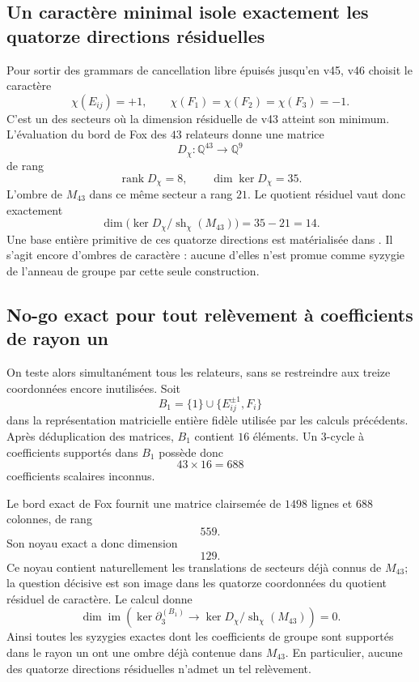 \documentclass[11pt,a4paper]{article}
\begin{document}
\subsection{Un caractère minimal isole exactement les quatorze directions résiduelles}

Pour sortir des grammars de cancellation libre épuisés jusqu'en v45, v46 choisit le caractère
\[
 \chi(E_{ij})=+1,
 \qquad
 \chi(F_1)=\chi(F_2)=\chi(F_3)=-1.
\]
C'est un des secteurs où la dimension résiduelle de v43 atteint son minimum. L'évaluation du bord de Fox des $43$ relateurs donne une matrice
\[
 D_\chi:\mathbb Q^{43}\longrightarrow\mathbb Q^9
\]
de rang
\[
 \boxed{\operatorname{rank}D_\chi=8},
 \qquad
 \boxed{\dim\ker D_\chi=35}.
\]
L'ombre de $M_{43}$ dans ce même secteur a rang $21$. Le quotient résiduel vaut donc exactement
\[
 \boxed{
 \dim\bigl(\ker D_\chi/\operatorname{sh}_\chi(M_{43})\bigr)
 =35-21=14.}
\]
Une base entière primitive de ces quatorze directions est matérialisée dans . Il s'agit encore d'ombres de caractère : aucune d'elles n'est promue comme syzygie de l'anneau de groupe par cette seule construction.

\subsection{No-go exact pour tout relèvement à coefficients de rayon un}

On teste alors simultanément tous les relateurs, sans se restreindre aux treize coordonnées encore inutilisées. Soit
\[
 B_1=\{1\}\cup\{E_{ij}^{\pm1},F_i\}
\]
dans la représentation matricielle entière fidèle utilisée par les calculs précédents. Après déduplication des matrices, $B_1$ contient $16$ éléments. Un $3$-cycle à coefficients supportés dans $B_1$ possède donc
\[
 43\times16=688
\]
coefficients scalaires inconnus.

Le bord exact de Fox fournit une matrice clairsemée de $1498$ lignes et $688$ colonnes, de rang
\[
 \boxed{559}.
\]
Son noyau exact a donc dimension
\[
 \boxed{129}.
\]
Ce noyau contient naturellement les translations de secteurs déjà connus de $M_{43}$; la question décisive est son image dans les quatorze coordonnées du quotient résiduel de caractère. Le calcul donne
\[
 \boxed{
 \dim\operatorname{im}\!
 \left(
   \ker\partial_3^{(B_1)}
   \longrightarrow
   \ker D_\chi/\operatorname{sh}_\chi(M_{43})
 \right)=0.}
\]
Ainsi toutes les syzygies exactes dont les coefficients de groupe sont supportés dans le rayon un ont une ombre déjà contenue dans $M_{43}$. En particulier, aucune des quatorze directions résiduelles n'admet un tel relèvement.
\end{document}

